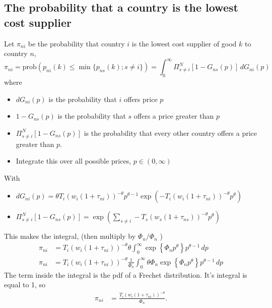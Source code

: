 \documentclass[11pt, pdftex]{article}
\begin{document}
\subsection*{The probability that a country is the lowest cost supplier}
Let $\pi_{ni}$ be the probability that country $i$ is the lowest cost supplier of good $k$ to country $n$,
\begin{equation}
    \pi_{ni}=\mathrm{prob}\left(p_{ni}\left(k \right) \leq \min\{ p_{ns}\left(k \right); s \neq i\} \right) = \int_0^\infty \Pi_{s \neq i}^N \left[ 1-G_{ns}(p) \right] \, dG_{ni}(p)
\end{equation}
where
\begin{itemize}
  \item $dG_{ni}(p)$ is the probability that $i$ offers price $p$
  \item $1-G_{ns}(p) $ is the probability that $s$ offers a price greater than $p$
  \item $\Pi_{s \neq i}^N \left[ 1-G_{ns}(p) \right]$ is the probability that every other country offers a price greater than $p$.
  \item Integrate this over all possible prices, $p \in (0,\infty)$
\end{itemize}
With
\begin{itemize}
\item $dG_{ni}\left(p \right) = \theta T_i \left(w_i\left(1+\tau_{ni} \right) \right)^{-\theta}p^{\theta-1} \exp\left(-T_i \left(w_i\left(1+\tau_{ni} \right) \right)^{-\theta}p^\theta \right)$
\item $\Pi_{s \neq i}^N \left[ 1-G_{ns}(p) \right] = \exp\left(\sum_{s \neq i}-T_s  \left(w_s\left(1+\tau_{ns} \right) \right)^{-\theta}p^\theta \right)$
\end{itemize}
This makes the integral, (then multiply by $\Phi_n/\Phi_n$ )
\begin{align}
  \pi_{ni} &= T_i \left(w_i\left(1+\tau_{ni} \right) \right)^{-\theta}\theta \int_0^\infty \exp\left\{\Phi_n p^\theta \right\} p^{\theta-1}\,dp \\
  \pi_{ni} &= T_i \left(w_i\left(1+\tau_{ni} \right) \right)^{-\theta} \frac{1}{\Phi_n}  \int_0^\infty \theta \Phi_n \exp\left\{\Phi_n p^\theta \right\} p^{\theta-1}\,dp
\end{align}
The term inside the integral is the pdf of a Frechet distribution.  It's integral is equal to 1, so
\begin{align}\label{eq:pini}
  \pi_{ni} &= \frac{T_i \left(w_i\left(1+\tau_{ni} \right) \right)^{-\theta} }{\Phi_n}.
\end{align}
\end{document}
